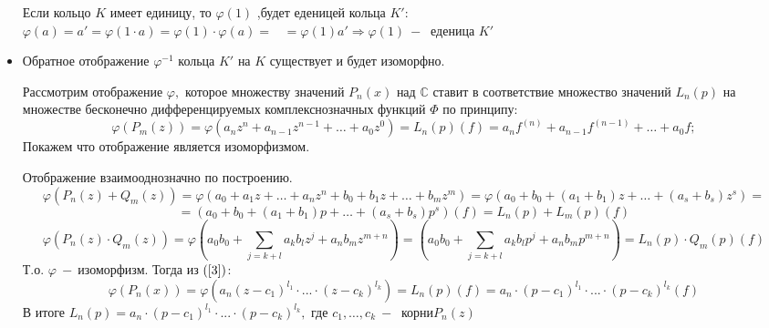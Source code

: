 \begin{itemize}
    Если кольцо $K$ имеет единицу, то $\varphi(1)$ ,будет еденицей кольца $K'$: $\varphi(a)=a'=\varphi(1\cdot a )= \varphi(1)\cdot \varphi(a) =\;\;\;= \varphi(1) a'\Rightarrow\varphi(1)~-~$ еденица $K'$ 
    \item Обратное отображение $\varphi^{-1}$ кольца $K'$ на $K$ существует и будет изоморфно.\par
    Рассмотрим отображение $\varphi,$ которое множеству значений $P_n(x)$ над $\mathds{C}$ ставит в соответствие множество значений $L_n(p)$ на множестве бесконечно дифференцируемых комплекснозначных функций $\varPhi$ по принципу:
    $$\varphi(P_m(z))=\varphi(a_nz^n+a_{n-1}z^{n-1}+\dots+a_0z^0)=L_n(p)(f)=a_nf^{(n)}+a_{n-1}f^{(n-1)}+\dots+a_0f;$$
    Покажем что отображение является изоморфизмом.\par Отображение взаимооднозначно по построению.
    $$\varphi(P_n(z)+Q_m(z))=\varphi(a_0+a_1z+\dots+a_nz^n+b_0+b_1z+\dots+b_mz^m)=\varphi(a_0+b_0+(a_1+b_1)z+\dots+(a_s+b_s)z^s)=$$$$=(a_0+b_0+(a_1+b_1)p+\dots+(a_s+b_s)p^s)(f)=L_n(p)+L_m(p)(f)$$
    $$\varphi(P_n(z)\cdot Q_m(z))=\varphi(a_0b_0+\displaystyle\sum_{j=k+l}a_kb_lz^j+a_nb_mz^{m+n})=(a_0b_0+\displaystyle\sum_{j=k+l}a_kb_lp^j+a_nb_mp^{m+n})=L_n(p)\cdot Q_m(p)(f)$$
    Т.о. $\varphi~-~$изоморфизм. Тогда из $(\ref{3})$: $$\varphi(P_n(x))=\varphi(a_n(z-c_1)^{l_1}\cdot ...\cdot (z-c_k)^{l_k})= L_n(p)(f)=a_n\cdot (p-c_1)^{l_1}\cdot ... \cdot (p-c_k)^{l_k}(f)$$
    В итоге  $L_n(p)=a_n\cdot (p-c_1)^{l_1}\cdot ... \cdot (p-c_k)^{l_k},$ где $c_1,\dots,c_k ~-~$ корни$P_n(z)$
    
\end{itemize}
